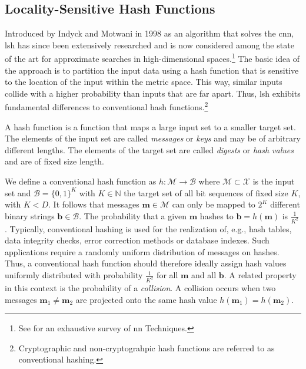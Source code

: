 \documentclass[../../../main.tex]{subfiles}
\begin{document}
\subsection{Locality-Sensitive Hash Functions} \label{subsec:locality-sensitive-hashes}

Introduced by Indyck and Motwani in 1998 \cite{indyk_approximate_1998} as an algorithm that solves the \gls{cnn}, \gls{lsh} has since been extensively researched and is now considered among the state of the art for approximate searches in high-dimensional spaces.\footnote{See \cite{nagarkar2021exploring} for an exhaustive survey of \gls{nn} Techniques.} The basic idea of the approach is to partition the input data using a hash function that is sensitive to the location of the input within the metric space. This way, similar inputs collide with a higher probability than inputs that are far apart. Thus, \gls{lsh} exhibits fundamental differences to conventional hash functions.\footnote{Cryptographic and non-cryptograhpic hash functions are referred to as conventional hashing.}

A hash function is a function that maps a large input set to a smaller target set. The elements of the input set are called \textit{messages} or \textit{keys} and may be of arbitrary different lengths. The elements of the target set are called \textit{digests} or \textit{hash values} and are of fixed size length. 

We define a conventional hash function as $h: \mathcal{M} \rightarrow \mathcal{B}$ where $\mathcal{M} \subset \mathcal{X}$ is the input set and $\mathcal{B}=\{0, 1\}^K$ with $K \in \mathbb{N}$ the target set of all bit sequences of fixed size $K$, with $K < D$. It follows that messages $\bm{m} \in \mathcal{M}$ can only be mapped to $2^K$ different binary strings $\bm{b} \in \mathcal{B}$. The probability that a given $\bm{m}$ hashes to $\bm{b} = h(\bm{m})$ is $\frac{1}{K^2}$. Typically, conventional hashing is used for the realization of, e.g., hash tables, data integrity checks, error correction methods or database indexes. Such applications require a randomly uniform distribution of messages on hashes. Thus, a conventional hash function should therefore ideally assign hash values uniformly distributed with probability $\frac{1}{K^2}$ for all $\bm{m}$ and all $\bm{b}$. A related property in this context is the probability of a \textit{collision}. A collision occurs when two messages $\bm{m}_1 \neq \bm{m}_2$ are projected onto the same hash value $h(\bm{m}_1) = h(\bm{m}_2)$. 
\end{document}
